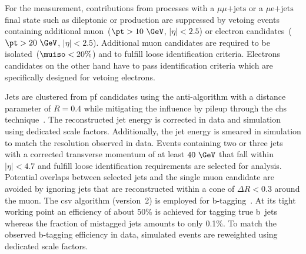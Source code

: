 
For the measurement, contributions from processes with a $\mu\mu\mathrm{\mbox{+}jets}$ or a $\mu\mathrm{e}\mathrm{\mbox{+}jets}$ final state such as dileptonic \ttbar or \zjets production are suppressed by vetoing events containing additional muon~($\pt>10~\GeV$, $|\eta|<2.5$) or electron candidates~($\pt>20~\GeV$, $|\eta|<2.5$). Additional muon candidates are required to be isolated~($\muiso<20\%$) and to fulfill loose identification criteria. Electrons candidates on the other hand have to pass identification criteria which are specifically designed for vetoing electrons.

Jets are clustered from \Gls{pf} candidates using the anti-\kt algorithm with a distance parameter of $R=0.4$ while mitigating the influence by pileup through the \gls{chs} technique~\cite{CMS-PAS-JME-14-001}. The reconstructed jet energy is corrected in data and simulation using dedicated scale factors. Additionally, the jet energy is smeared in simulation to match the resolution observed in data. Events containing two or three jets with a corrected transverse momentum of at least $40~\GeV$ that fall within $|\eta|<4.7$ and fulfill loose identification requirements are selected for analysis. Potential overlaps between selected jets and the single muon candidate are avoided by ignoring jets that are reconstructed within a cone of $\Delta R<0.3$ around the muon. The \acrfull{csv} algorithm (version~2) is employed for b-tagging~\cite{CMS-PAS-BTV-15-001}. At its tight working point an efficiency of about 50\% is achieved for tagging true b~jets whereas the fraction of mistagged jets amounts to only 0.1\%. To match the observed b-tagging efficiency in data, simulated events are reweighted using dedicated scale factors.

